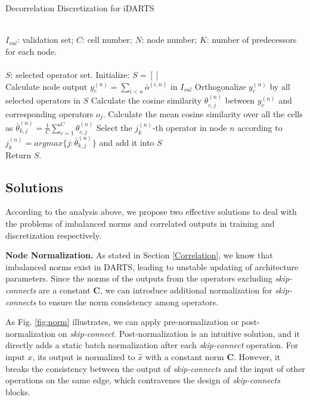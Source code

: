\documentclass[journal]{IEEEtran}
\begin{document}
\begin{algorithm}[htb]
\caption{Decorrelation Discretization for iDARTS}
\label{Alg:1}
\begin{algorithmic}[1]
\REQUIRE ~~\\
$I_{val}$: validation set; $C$: cell number; $N$: node number; $K$: number of predecessors for each node. \\
\ENSURE ~~\\
$S$: selected operator set.
\STATE Initialize: $S = []$\\
{
{
\STATE Calculate node output $y_c^{(n)}=\sum_{i<n}\bar{o}^{(i,n)}$ in $I_{val}$
\STATE Orthogonalize $y_c^{(n)}$  by all selected operators in $S$
\STATE Calculate the cosine similarity $\theta_{c,j}^{(n)}$ between  $y_c^{(n)}$ and corresponding operators $o_j$.
\ENDFOR
}
\ENDFOR
}
\STATE Calculate the mean cosine similarity over all the cells as ${\bar{\theta}}_{k,j}^{(n)}=\frac{1}{C}\sum_{c=1}^C\theta_{c,j}^{(n)}$
\STATE Select the $j_k^{(n)}$-th operator in node $n$ according to $j_k^{(n)}=argmax\{j:{\bar{\theta}_{k,j}^{(n)}}\}$ and add it into $S$
\ENDFOR\\
\STATE Return $S$.

\end{algorithmic}
\end{algorithm}

\subsection{Solutions}
According to the analysis above, we propose two effective solutions to deal with the problems of imbalanced norms and correlated outputs in training and discretization respectively.

\textbf{Node Normalization.} As stated in Section \ref{Correlation}, we know that imbalanced norms exist in DARTS, leading to unstable updating of architecture parameters. Since the norms of the outputs from the operators excluding \textit{skip-connects} are a constant $\mathbf{C}$, we can introduce additional normalization for \textit{skip-connects} to ensure the norm consistency among operators.  

As Fig. \ref{fig:norm} illustrates, we can apply pre-normalization or  post-normalization on \textit{skip-connect}. Post-normalization is an intuitive solution, and it directly adds a static batch normalization after each \textit{skip-connect} operation. For input $x$, its output is normalized to $\hat{x}$ with a constant norm $\mathbf{C}$.  However, it breaks the consistency between the output of \textit{skip-connects} and the input of other operations on the same edge, which contravenes the design of \textit{skip-connects} blocks. 
\end{document}
